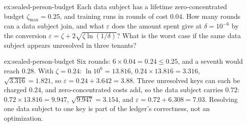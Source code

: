 
\begin{pdexercise}[kind=Check,rating=1]{ex:sealed-person-budget}
Each data subject has a lifetime zero-concentrated budget $\zeta_{\max}=0.25$, and
training runs in rounds of cost $0.04$. How many rounds can a data subject join, and
what $\varepsilon$ does the amount spent give at $\delta=10^{-6}$ by the
conversion $\varepsilon=\zeta+2\sqrt{\zeta\ln(1/\delta)}$? What is the worst case
if the same data subject appears unresolved in three tenants?
\end{pdexercise}
\begin{pdsolution}{ex:sealed-person-budget}
Six rounds: $6\times0.04=0.24\le0.25$, and a seventh would reach $0.28$. With
$\zeta=0.24$: $\ln10^6=13.816$, $0.24\times13.816=3.316$, $\sqrt{3.316}=1.821$,
so $\varepsilon=0.24+3.642=3.88$. Three unresolved keys can each be charged
$0.24$, and zero-concentrated costs add, so the data subject carries $0.72$:
$0.72\times13.816=9.947$, $\sqrt{9.947}=3.154$, and
$\varepsilon=0.72+6.308=7.03$. Resolving one data subject to one key is part of the
ledger's correctness, not an optimization.
\end{pdsolution}

